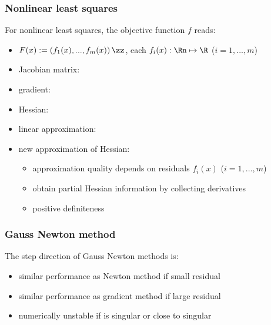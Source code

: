 	\subsubsection{Nonlinear least squares}
	For nonlinear least squares, the objective function $f$ reads:
	\vspace{-5mm}
	\begin{itemize}
		\item $F(x):=\left(f_1(x),...,f_m(x)\right)\zz$, each $f_i(x):\Rn\mapsto \R$ ($i=1,...,m$)
		\item Jacobian matrix: 
		\item gradient: 
		\item Hessian: 
		\item linear approximation:
		\item new approximation of Hessian: 
		\begin{itemize}
			\item approximation quality depends on residuals $f_i(x)$  ($i=1,...,m$)\\[1mm]
			\item obtain partial Hessian information by collecting derivatives\\[1mm]
			\item positive definiteness
		\end{itemize}
	\end{itemize}

	\subsubsection{Gauss Newton method}
	The step direction of Gauss Newton methods is:
	\vspace{-6mm}
	\begin{itemize}
		\item similar performance as Newton method if small residual
		\item similar performance as gradient method if large residual
		\item numerically unstable if  is singular or close to singular
 	\end{itemize}
    \medskip

